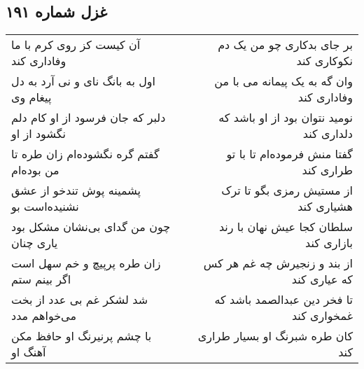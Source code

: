 \begin{center}
\section*{غزل شماره ۱۹۱}
\label{sec:sh191}
\begin{longtable}{l p{0.5cm} r}
آن کیست کز روی کرم با ما وفاداری کند
&&
بر جای بدکاری چو من یک دم نکوکاری کند
\\
اول به بانگ نای و نی آرد به دل پیغام وی
&&
وان گه به یک پیمانه می با من وفاداری کند
\\
دلبر که جان فرسود از او کام دلم نگشود از او
&&
نومید نتوان بود از او باشد که دلداری کند
\\
گفتم گره نگشوده‌ام زان طره تا من بوده‌ام
&&
گفتا منش فرموده‌ام تا با تو طراری کند
\\
پشمینه پوش تندخو از عشق نشنیده‌است بو
&&
از مستیش رمزی بگو تا ترک هشیاری کند
\\
چون من گدای بی‌نشان مشکل بود یاری چنان
&&
سلطان کجا عیش نهان با رند بازاری کند
\\
زان طره پرپیچ و خم سهل است اگر بینم ستم
&&
از بند و زنجیرش چه غم هر کس که عیاری کند
\\
شد لشکر غم بی عدد از بخت می‌خواهم مدد
&&
تا فخر دین عبدالصمد باشد که غمخواری کند
\\
با چشم پرنیرنگ او حافظ مکن آهنگ او
&&
کان طره شبرنگ او بسیار طراری کند
\\
\end{longtable}
\end{center}
